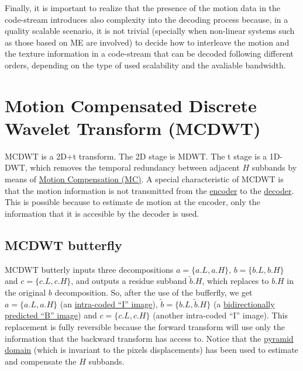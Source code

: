 Finally, it is important to realize that the presence of the motion
data in the code-stream introduces also complexity into the decoding
process because, in a quality scalable scenario, it is not trivial
(specially when non-linear systems such as those based on ME are
involved) to decide how to interleave the motion and the texture
information in a code-stream that can be decoded following different
orders, depending on the type of used scalability and the avaliable
bandwidth.

\section{Motion Compensated Discrete Wavelet Transform (MCDWT)}
MCDWT is a 2D+t transform. The 2D stage is MDWT. The t stage is a
1D-DWT, which removes the temporal redundancy between adjacent $H$
subbands by means of
\href{https://en.wikipedia.org/wiki/Motion_compensation}{Motion
  Compensation (MC)}. A special characteristic of MCDWT is that the
motion information is not transmitted from the
\href{https://en.wikipedia.org/wiki/Encoder}{encoder} to the
\href{https://en.wikipedia.org/wiki/Decoder}{decoder}. This is
possible because to estimate de motion at the encoder, only the
information that it is accesible by the decoder is used.

\subsection{MCDWT butterfly}

MCDWT butterly inputs three decompositions $a=\{a.L, a.H\}$, $b=\{b.L,
b.H\}$ and $c=\{c.L, c.H\}$, and outputs a residue subband
$\tilde{b}.H$, which replaces to $b.H$ in the original $b$
decomposition. So, after the use of the bufferfly, we get $a=\{a.L,
a.H\}$ (an
\href{https://en.wikipedia.org/wiki/Video_compression_picture_types}{intra-coded
  ``I'' image}), $\tilde{b}=\{b.L, \tilde{b}.H\}$ (a
\href{https://en.wikipedia.org/wiki/Video_compression_picture_types}{bidirectionally
  predicted ``B'' image}) and $c=\{c.L, c.H\}$ (another intra-coded
``I'' image). This replacement is fully reversible because the forward
transform will use only the information that the backward transform
has access to. Notice that the
\href{http://www.vtvt.ece.vt.edu/research/references/video/DCT_Video_Compression/Zhang92a.pdf}{pyramid
  domain} (which is invariant to the pixels displacements) has been
used to estimate and compensate the $H$ subbands.

